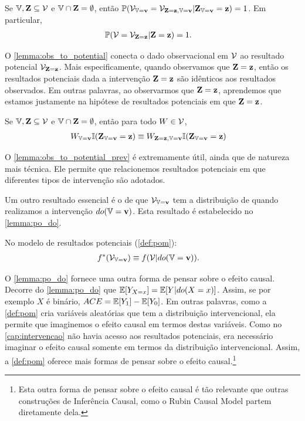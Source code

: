 \begin{lemma} 
 \label{lemma:obs_to_potential}
 Se ${\mathbb V}, {\mathbf{Z}} \subseteq {\mathcal V}$ e
 ${\mathbb V} \cap {\mathbf{Z}} = \emptyset$, então
 ${\mathbb P}({\mathcal V}_{{\mathbb V}={\mathbf{v}}} = {\mathcal V}_{{\mathbf{Z}}={\mathbf{z}}, {\mathbb V}={\mathbf{v}}}|{\mathbf{Z}}_{{\mathbb V}={\mathbf{v}}}={\mathbf{z}}) = 1$.
 Em particular,
 \begin{align*}
  {\mathbb P}({\mathcal V} = {\mathcal V}_{{\mathbf{Z}}={\mathbf{z}}}|{\mathbf{Z}} = {\mathbf{z}}) &= 1.
 \end{align*}
\end{lemma}

O \cref{lemma:obs_to_potential} conecta
o dado observacional em ${\mathcal V}$ ao
resultado potencial ${\mathcal V}_{{\mathbf{Z}}={\mathbf{z}}}$.
Mais especificamente, quando 
observamos que ${\mathbf{Z}}={\mathbf{z}}$, então
os resultados potenciais dada a
intervenção ${\mathbf{Z}}={\mathbf{z}}$ são
idênticos aos resultados observados.
Em outras palavras,
ao observarmos que ${\mathbf{Z}}={\mathbf{z}}$, aprendemos que
estamos justamente na hipótese
de resultados potenciais em que ${\mathbf{Z}}={\mathbf{z}}$.

\begin{lemma}
 \label{lemma:obs_to_potential_prev}
 Se ${\mathbb V}, {\mathbf{Z}} \subseteq {\mathcal V}$ e
 ${\mathbb V} \cap {\mathbf{Z}} = \emptyset$, então
 para todo $W \in {\mathcal V}$,
 \begin{align*}
  W_{{\mathbb V}={\mathbf{v}}} {\mathbb I}({\mathbf{Z}}_{{\mathbb V}={\mathbf{v}}} = {\mathbf{z}})
  &\equiv W_{{\mathbf{Z}} = {\mathbf{z}}, {\mathbb V}={\mathbf{v}}} {\mathbb I}({\mathbf{Z}}_{{\mathbb V}={\mathbf{v}}} = {\mathbf{z}})
 \end{align*}
\end{lemma}

O \cref{lemma:obs_to_potential_prev} é extremamente útil,
ainda que de natureza mais técnica.
Ele permite que relacionemos resultados potenciais em que
diferentes tipos de intervenção são adotados.

Um outro resultado essencial é
o de que ${\mathcal V}_{{\mathbb V}={\mathbf{v}}}$ tem
a distribuição de quando
realizamos a intervenção $do({\mathbb V}={\mathbf{v}})$.
Esta resultado é estabelecido
no \cref{lemma:po_do}.

\begin{lemma}
 \label{lemma:po_do}
 No modelo de resultados potenciais (\cref{def:pom}):
 \begin{align*}
  f^*({\mathcal V}_{{\mathbb V}={\mathbf{v}}})
  &\equiv f({\mathcal V}|do({\mathbb V}={\mathbf{v}})).
 \end{align*}
\end{lemma}

O \cref{lemma:po_do} fornece 
uma outra forma de pensar sobre o efeito causal.
Decorre do \cref{lemma:po_do} que
${\mathbb E}[Y_{X=x}] = {\mathbb E}[Y|do(X=x)]$. Assim,
se por exemplo $X$ é binário,
${ACE} = {\mathbb E}[Y_1] - {\mathbb E}[Y_0]$.
Em outras palavras, 
como a \cref{def:pom} cria 
variáveis aleatórias que tem a distribuição intervencional,
ela permite que imaginemos o efeito causal
em termos destas variáveis.
Como no \cref{cap:intervencao} 
não havia acesso aos resultados potenciais, 
era necessário imaginar o efeito causal
somente em termos da distribuição intervencional.
Assim, a \cref{def:pom} oferece
mais formas de pensar sobre o efeito causal.\footnote{
 Esta outra forma de pensar sobre o efeito causal é
 tão relevante que outras construções de Inferência Causal,
 como o Rubin Causal Model \citep{Holland1986} partem
 diretamente dela.
}

